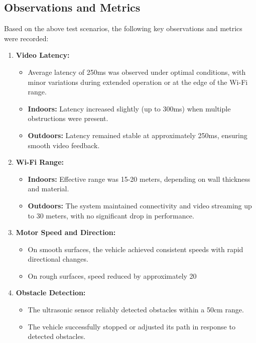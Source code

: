 \documentclass[12pt,a4paper]{report}
\begin{document}
\subsection{Observations and Metrics}

Based on the above test scenarios, the following key observations and metrics were recorded:

\begin{enumerate}
    \item \textbf{Video Latency:}
    \begin{itemize}
        \item Average latency of 250ms was observed under optimal conditions, with minor variations during extended operation or at the edge of the Wi-Fi range.
        \item \textbf{Indoors:} Latency increased slightly (up to 300ms) when multiple obstructions were present.
        \item \textbf{Outdoors:} Latency remained stable at approximately 250ms, ensuring smooth video feedback.
    \end{itemize}
    
    \item \textbf{Wi-Fi Range:}
    \begin{itemize}
        \item \textbf{Indoors:} Effective range was 15-20 meters, depending on wall thickness and material.
        \item \textbf{Outdoors:} The system maintained connectivity and video streaming up to 30 meters, with no significant drop in performance.
    \end{itemize}
    
    \item \textbf{Motor Speed and Direction:}
    \begin{itemize}
        \item On smooth surfaces, the vehicle achieved consistent speeds with rapid directional changes.
        \item On rough surfaces, speed reduced by approximately 20%
    \end{itemize}
    
    \item \textbf{Obstacle Detection:}
    \begin{itemize}
        \item The ultrasonic sensor reliably detected obstacles within a 50cm range.
        \item The vehicle successfully stopped or adjusted its path in response to detected obstacles.
    \end{itemize}
    

\end{enumerate}
\end{document}
